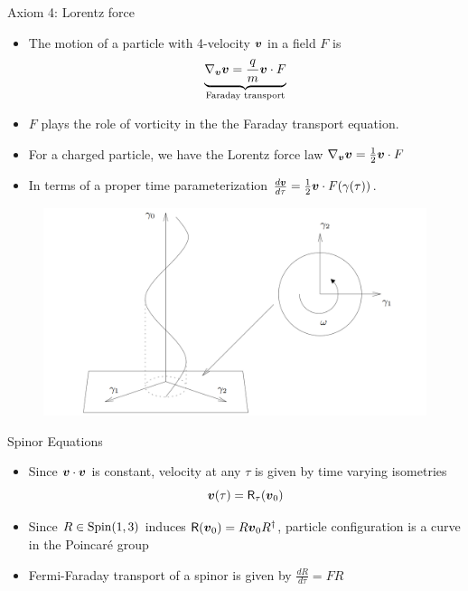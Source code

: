 \documentclass[aspectratio=169]{beamer}
\begin{document}
\begin{frame}{Axiom 4: Lorentz force}
\vfill
\begin{itemize}
	\item The motion of a particle with 4-velocity $\boldsymbol{v}$ in a field $F$ is
	    \[
	    \underbrace{\nabla_{\boldsymbol{v}}\boldsymbol{v} = \frac{q}{m} \boldsymbol{v} \cdot F}_{\textrm{Faraday transport}}
	    \]
	\item $F$ plays the role of vorticity in the the Faraday transport equation.
\end{itemize}
\vfill
\end{frame}

\begin{frame}{}
    \vfill
    \begin{itemize}
        \item For a charged particle, we have the Lorentz force law $\nabla_{\boldsymbol{v}}\boldsymbol{v} = \frac{1}{2} \boldsymbol{v}\cdot F$
        \item In terms of a proper time parameterization $\frac{d\boldsymbol{v}}{d\tau} = \frac{1}{2} \boldsymbol{v} \cdot F(\gamma(\tau))$.
    \end{itemize}
    \begin{figure}
        \centering
        \includegraphics[width=.65\textwidth]{figures/helical_path.png}
    \end{figure}
    \vfill
\end{frame}

\begin{frame}{Spinor Equations}
    \vfill

    \begin{itemize}
        \item Since $\boldsymbol{v}\cdot\boldsymbol{v}$ is constant, velocity at any $\tau$ is given by time varying isometries
    \[
    \boldsymbol{v}(\tau)=\mathsf{R}_\tau(\boldsymbol{v}_0)
    \]
    \item Since $R \in \mathrm{Spin}(1,3)$ induces $\mathsf{R}(\boldsymbol{v}_0)=R\boldsymbol{v}_0 R^\dagger$, particle configuration is a curve in the Poincar\'e group 
    \item Fermi-Faraday transport of a spinor is given by $\frac{dR}{d\tau} = FR$
    \end{itemize}
    \vfill
\end{frame}
\end{document}
